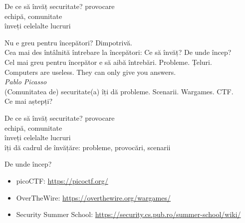 \documentclass{simple}
\begin{document}
\begin{frame}{De ce să învăț securitate?}
  \centering
  \vspace{0.5cm}
  \Large{provocare} \\
  \vspace{0.5cm}
  \Large{echipă, comunitate} \\
  \pause
  \vspace{0.5cm}
  \Large{înveți celelalte lucruri}
\end{frame}

\begin{frame}{Nu e greu pentru începători?}
  \centering
  \pause
  \vspace{0.3cm}
  \large{Dimpotrivă.} \\
  \pause
  \vspace{0.3cm}
  \large{Cea mai des întâlnită întrebare la începători: Ce să învăț? De unde încep?} \\
  \pause
  \vspace{0.3cm}
  \large{Cel mai greu pentru începător e să aibă întrebări. Probleme. Țeluri.} \\
  \pause
  \vspace{0.3cm}
  \large{Computers are useless. They can only give you answers.} \\
  \vspace{2mm}
  \hfill \textit{Pablo Picasso} \\
  \pause
  \vspace{0.3cm}
  \large{(Comunitatea de) securitate(a) îți dă probleme. Scenarii. Wargames. CTF.} \\
  \pause
  \vspace{0.3cm}
  \large{Ce mai aștepți?}
\end{frame}

\begin{frame}{De ce să învăț securitate?}
  \centering
  \vspace{0.5cm}
  \Large{provocare} \\
  \vspace{0.5cm}
  \Large{echipă, comunitate} \\
  \vspace{0.5cm}
  \Large{înveți celelalte lucruri} \\
  \pause
  \vspace{0.5cm}
  \Large{îți dă cadrul de învățăre: probleme, provocări, scenarii}
\end{frame}

\begin{frame}{De unde încep?}
  \begin{itemize}
    \item picoCTF: \url{https://picoctf.org/}
    \item OverTheWire: \url{https://overthewire.org/wargames/}
    \item Security Summer School: \url{https://security.cs.pub.ro/summer-school/wiki/}
  \end{itemize}
\end{frame}
\end{document}
